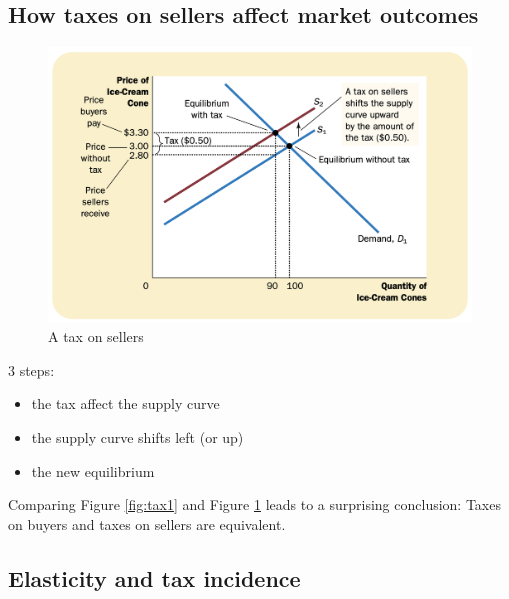 \subsection{How taxes on sellers affect market outcomes}

\begin{figure}[!ht]
  \centering
  \includegraphics[width=\textwidth]{pics/tax2}
  \caption{A tax on sellers}
  \label{fig:tax2}
\end{figure}


3 steps:
\begin{itemize}
\item the tax affect the supply curve
\item the supply curve shifts left (or up)
\item the new equilibrium
\end{itemize}


Comparing Figure \ref{fig:tax1} and Figure \ref{fig:tax2} leads to a surprising conclusion: Taxes on buyers and taxes on sellers are equivalent.


\subsection{Elasticity and tax incidence}

